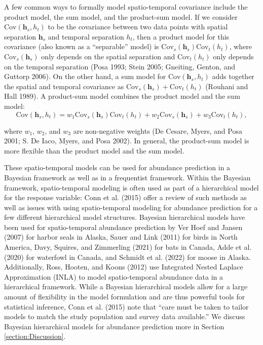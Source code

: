 \documentclass[smallextended]{svjour3}       %
\begin{document}
A few common ways to formally model spatio-temporal covariance include
the product model, the sum model, and the product-sum model. If we
consider \(\text{Cov}(\mathbf{h}_s, h_t)\) to be the covariance between
two data points with spatial separation \(\mathbf{h}_s\) and temporal
separation \(h_t\), then a product model for this covariance (also known
as a ``separable'' model) is
\(\text{Cov}_s(\mathbf{h}_s) \text{Cov}_t(h_t)\), where
\(\text{Cov}_s(\mathbf{h}_s)\) only depends on the spatial separation
and \(\text{Cov}_t(h_t)\) only depends on the temporal separation (Posa
1993; Stein 2005; Gneiting, Genton, and Guttorp 2006). On the other
hand, a sum model for \(\text{Cov}(\mathbf{h}_s, h_t)\) adds together
the spatial and temporal covariance as
\(\text{Cov}_s(\mathbf{h}_s) + \text{Cov}_t(h_t)\) (Rouhani and Hall
1989). A product-sum model combines the product model and the sum model:
\mbox{} \begin{equation}
\text{Cov}(\mathbf{h}_s, h_t) = w_1\text{Cov}_s(\mathbf{h}_s) \text{Cov}_t(h_t) + w_2\text{Cov}_s(\mathbf{h}_s) + w_3\text{Cov}_t(h_t),
\end{equation}

\noindent where \(w_1\), \(w_2\), and \(w_3\) are non-negative weights
(De Cesare, Myers, and Posa 2001; S. De Iaco, Myers, and Posa 2002). In
general, the product-sum model is more flexible than the product model
and the sum model.

These spatio-temporal models can be used for abundance prediction in a
Bayesian framework as well as in a frequentist framework. Within the
Bayesian framework, spatio-temporal modeling is often used as part of a
hierarchical model for the response variable: Conn et al. (2015) offer a
review of such methods as well as issues with using spatio-temporal
modeling for abundance prediction for a few different hierarchical model
structures. Bayesian hierarchical models have been used for
spatio-temporal abundance prediction by Ver Hoef and Jansen (2007) for
harbor seals in Alaska, Sauer and Link (2011) for birds in North
America, Davy, Squires, and Zimmerling (2021) for bats in Canada, Adde
et al. (2020) for waterfowl in Canada, and Schmidt et al. (2022) for
moose in Alaska. Additionally, Ross, Hooten, and Koons (2012) use
Integrated Nested Laplace Approximation (INLA) to model spatio-temporal
abundance data in a hierarchical framework. While a Bayesian
hierarchical models allow for a large amount of flexibility in the model
formulation and are thus powerful tools for statistical inference, Conn
et al. (2015) note that ``care must be taken to tailor models to match
the study population and survey data available.'' We discuss Bayesian
hierarchical models for abundance prediction more in Section
\ref{section:Discussion}.
\end{document}
